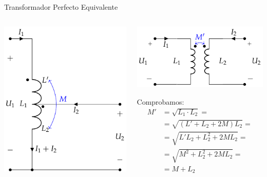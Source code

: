 \documentclass[aspectratio=169, usenames,svgnames,dvipsnames]{beamer}
\begin{document}
\begin{frame}[label={sec:orgf2a53ac}]{Transformador Perfecto Equivalente}
\begin{columns}
\begin{column}{0.5\columnwidth}
\begin{center}
\includegraphics[height=0.6\textheight]{../figs/AutotrafoPerfecto.pdf}
\end{center}
\end{column}
\begin{column}{0.5\columnwidth}
\begin{center}
\includegraphics[height=0.33\textheight]{../figs/AutoTrafo_TrafoPerfecto.pdf}
\end{center}

Comprobamos:
\begin{align*}
  M' &= \sqrt{L_1 \cdot L_2} = \\
     &= \sqrt{(L' + L_2 + 2M) L_2} =\\
     &= \sqrt{L'L_2 + L_2^2 + 2ML_2} =\\
     &= \sqrt{M^2 + L_2^2 + 2ML_2} = \\
     &= M + L_2
\end{align*}
\end{column}
\end{columns}
\end{frame}
\end{document}
